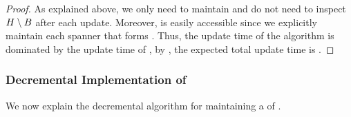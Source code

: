 \begin{proof}
As explained above, we only need to maintain  and do not need to inspect \( { H} \setminus {\ensuremath{ B}} \) after each update.
Moreover,  is easily accessible since we explicitly maintain each spanner that forms .
Thus, the update time of the algorithm is dominated by the update time of , by , the expected total update time is .
\end{proof}




\subsubsection{Decremental Implementation of } \label{subsec:decremental_spectral_sparsify}

We now explain the decremental algorithm for maintaining a \SpectralHypersparsifier{} of .


